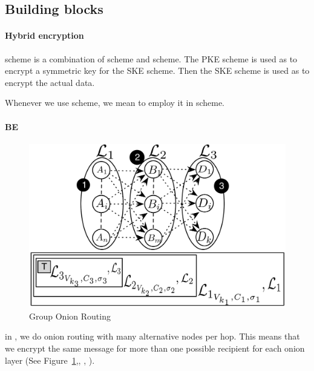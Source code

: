 \subsection{Building blocks}%
\label{BuildingBlocks}

\NewAlgorithm{\DeBEsetup}{\DeBE[Setup]}
\NewAlgorithm{\DeBEjoin}{\DeBE[Join]}
\NewAlgorithm{\DeBEenc}{\DeBE[Enc]}
\NewAlgorithm{\DeBEdec}{\DeBE[Dec]}

\paragraph*{Hybrid encryption}\label{KEM}

 scheme is a combination of  scheme and  scheme.
The \ac{PKE} scheme is used as  to encrypt a symmetric key for the 
\ac{SKE} scheme.
Then the \ac{SKE} scheme is used as  to encrypt the actual data.

Whenever we use  scheme, we mean to employ it in  scheme.

\paragraph*{\Acl*{BE}}\label{BE}

\begin{figure}[t]
\centering
  \includegraphics[scale=.20]{figures/pors2.pdf}
  \caption{\label{fig:por} Group Onion Routing}
\end{figure}

in \name, we do onion routing with many
alternative nodes per hop. This means that we encrypt the same message
for more than one possible recipient for each onion layer (See
Figure~\ref{fig:por},, , ).

